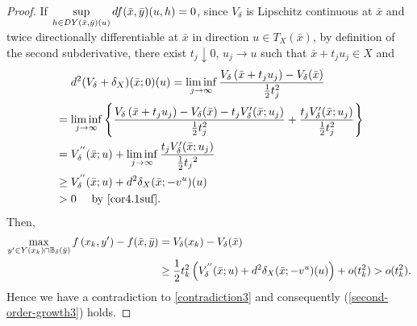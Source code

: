 \documentclass[10pt,a4paper]{amsart}
\begin{document}
\begin{proof}
If $\sup\limits_{h \in D Y(\bar x,\bar y)(u)} {\rm d} f(\bar x,\bar y)(u,h) = 0$, since $V_{\delta}$ is Lipschitz continuous at $\bar x$ and twice directionally differentiable at $\bar x$ in direction $u \in T_X(\bar x) $, by definition of the second subderivative, there exist $t_j\downarrow 0$, $u_j\to u$ such that  $\bar x+t_ju_j \in X$ and
\begin{eqnarray*}\label{}
	\begin{aligned}
		& \quad\ {\rm d}^2 (V_{\delta}+\delta_X)(\bar x;0)(u)  = \liminf\limits_{j \to \infty} \frac{V_{\delta}\left(\bar{x}+t_ju_j\right)-V_{\delta}(\bar{x})}{\frac{1}{2} t_j^2}  \\
		&= \liminf\limits_{j \to \infty} \left\{ \frac{V_{\delta}\left(\bar{x}+t_ju_j\right)-V_{\delta}(\bar{x})-t_jV^{\prime}_{\delta}(\bar x;u_j)}{\frac{1}{2} t_j^2} + \frac{t_jV^{\prime}_{\delta}(\bar x;u_j)}{\frac{1}{2} t_j^2} \right\} \\
		&=V^{''}_{\delta}(\bar x;u) + \liminf_{j \to \infty} \frac{t_jV^{\prime}_{\delta}(\bar x;u_j)}{\frac{1}{2}{t_j}^2}    \\
		&\geq V^{''}_{\delta}(\bar x;u) + {\rm d}^2 \delta_X(\bar x;-v^u)(u) \\
		& >0 \quad \mbox{ by } \eqref{cor4.1suf}.\\
	\end{aligned}
\end{eqnarray*}
Then,
\begin{equation*}
	\begin{aligned}
		\max _{y^{\prime}  \in  Y(x_k)\cap \mathbb{B}_{\delta}(\bar y)} f\left(x_k, y^{\prime}\right)-f(\bar x,\bar y) & = V_{\delta}(x_k) - V_{\delta}(\bar x) \\
		&  \geq \frac{1}{2}t_k^2 \left( V^{''}_{\delta}(\bar x;u) + {\rm d}^2 \delta_X(\bar x;-v^u)(u) \right)+o(t_k^2) > o(t_k^2).
	\end{aligned}
\end{equation*}
Hence we have a contradiction to \eqref{contradiction3} and consequently (\ref{second-order-growth3}) holds.
\end{proof}
\end{document}
